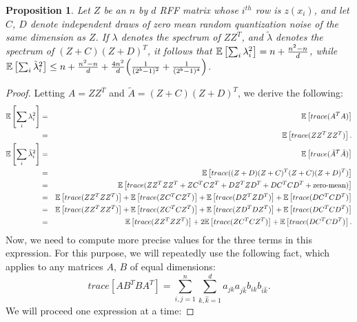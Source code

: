 \documentclass[12pt]{article}
\newcommand{\hk}{\hat{k}}
\newcommand{\tA}{\tilde{A}}
\newcommand{\tlambda}{\tilde{\lambda}}
\newtheorem{proposition}[theorem]{Proposition}
\begin{document}
\begin{proposition}
	Let $Z$ be an $n$ by $d$ RFF matrix whose $i^{th}$ row is $z(x_i)$, and let $C$, $D$ denote independent draws of zero mean random quantization noise of the same dimension as $Z$.  If $\lambda$ denotes the spectrum of $ZZ^T$, and $\tlambda$ denotes the spectrum of $(Z+C)(Z+D)^T$, it follows that 
	$\expect{}{\sum_i \lambda_i^2} = n + \frac{n^2-n}{d}$, while 
	$\expect{}{\sum_i \tlambda_i^2} \leq n + \frac{n^2-n}{d} +  \frac{4n^2}{d}\Big(\frac{1}{(2^b-1)^2} + \frac{1}{(2^b-1)^4}\Big)$.
\end{proposition}
\begin{proof}
Letting $A = ZZ^T$ and $\tA = (Z+C)(Z+D)^T$, we derive the following:
\begin{eqnarray*}
	\expect{}{\sum_i{\lambda_i^2}} &=& 	\expect{}{trace(A^T A)} \\
	&=& \expect{}{trace(ZZ^TZZ^T)}. \\
	\expect{}{\sum_i{\tlambda_i^2}} &=& \expect{}{trace(\tA^T\tA)} \\
	&=& \expect{}{trace((Z+D)(Z+C)^T(Z+C)(Z+D)^T)} \\
	&=& \expect{}{trace(ZZ^TZZ^T + ZC^TCZ^T + DZ^TZD^T + DC^TCD^T + \text{zero-mean})}\\ 
	&=& \expect{}{trace(ZZ^TZZ^T)} + \expect{}{trace(ZC^TCZ^T)} + \expect{}{trace(DZ^TZD^T)} + \expect{}{trace(DC^TCD^T)}\\
	&=& \expect{}{trace(ZZ^TZZ^T)} + \expect{}{trace(ZC^TCZ^T)} + \expect{}{trace(ZD^TDZ^T)} + \expect{}{trace(DC^TCD^T)}\\
	&=& \expect{}{trace(ZZ^TZZ^T)} + 2\expect{}{trace(ZC^TCZ^T)} + \expect{}{trace(DC^TCD^T)}.
\end{eqnarray*}
Now, we need to compute more precise values for the three terms in this expression.  For this purpose, we will repeatedly use the following fact, which applies to any matrices $A$, $B$ of equal dimensions:
$$trace[AB^TBA^T] = \sum_{i,j=1}^n \sum_{k,\hk=1}^d a_{jk}a_{j\hk}b_{ik}b_{i\hk}.$$
We will proceed one expression at a time:


\end{proof}
\end{document}

